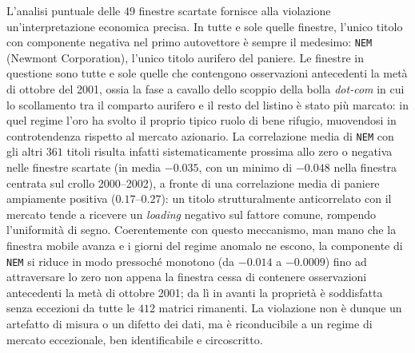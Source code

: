 L'analisi puntuale delle $49$ finestre scartate fornisce alla violazione un'interpretazione economica precisa. In tutte e sole quelle finestre, l'unico titolo con componente negativa nel primo autovettore è sempre il medesimo: \texttt{NEM} (Newmont Corporation), l'unico titolo aurifero del paniere. Le finestre in questione sono tutte e sole quelle che contengono osservazioni antecedenti la metà di ottobre del 2001, ossia la fase a cavallo dello scoppio della bolla \emph{dot-com} in cui lo scollamento tra il comparto aurifero e il resto del listino è stato più marcato: in quel regime l'oro ha svolto il proprio tipico ruolo di bene rifugio, muovendosi in controtendenza rispetto al mercato azionario. La correlazione media di \texttt{NEM} con gli altri $361$ titoli risulta infatti sistematicamente prossima allo zero o negativa nelle finestre scartate (in media $-0.035$, con un minimo di $-0.048$ nella finestra centrata sul crollo 2000--2002), a fronte di una correlazione media di paniere ampiamente positiva ($0.17$--$0.27$): un titolo strutturalmente anticorrelato con il mercato tende a ricevere un \emph{loading} negativo sul fattore comune, rompendo l'uniformità di segno. Coerentemente con questo meccanismo, man mano che la finestra mobile avanza e i giorni del regime anomalo ne escono, la componente di \texttt{NEM} si riduce in modo pressoché monotono (da $-0.014$ a $-0.0009$) fino ad attraversare lo zero non appena la finestra cessa di contenere osservazioni antecedenti la metà di ottobre 2001; da lì in avanti la proprietà è soddisfatta senza eccezioni da tutte le $412$ matrici rimanenti. La violazione non è dunque un artefatto di misura o un difetto dei dati, ma è riconducibile a un regime di mercato eccezionale, ben identificabile e circoscritto.

